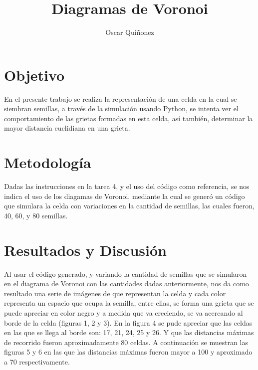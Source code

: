 \documentclass{article}
\title { Diagramas de Voronoi}
\author{Oscar Qui\~nonez}
\begin{document}
\maketitle
 
\section{Objetivo}\label{met}

En el presente trabajo se realiza la representaci\'on de una celda en la cual se siembran semillas, a trav\'es de la simulaci\'on usando Python, se intenta ver el comportamiento de las grietas formadas en esta celda, as\'i tambi\'en, determinar la mayor distancia euclidiana en una grieta.

\section{Metodolog\'ia}\label{met}

Dadas las instrucciones \cite{satuelisa} en la tarea 4, y el uso del c\'odigo \cite{baz}como referencia, se nos indica el uso de los diagamas de Voronoi, mediante la cual se gener\'o un c\'odigo que simulara la celda con variaciones en la cantidad de semillas, las cuales fueron, 40, 60, y 80 semillas.  

\section{Resultados y Discusi\'on}\label{res}

Al usar el c\'odigo generado, y variando la cantidad de semillas que se simularon en el diagrama de Voronoi con las cantidades dadas anteriormente, nos da como resultado una serie de im\'agenes de que representan la celda y cada color representa un espacio que ocupa la semilla, entre ellas, se forma una grieta que se puede apreciar en color negro y a medida que va creciendo, se va acercando al borde de la celda (figuras 1, 2 y 3).
En la figura 4 se pude apreciar que las celdas en las que se llega al borde son: 17, 21, 24, 25 y 26. Y que las distancias m\'aximas de recorrido fueron aproximadamente 80 celdas.
A continuaci\'on se muestran las figuras 5 y 6 en las que las distancias m\'aximas fueron mayor a 100 y aproximado a 70 respectivamente.
\end{document}
